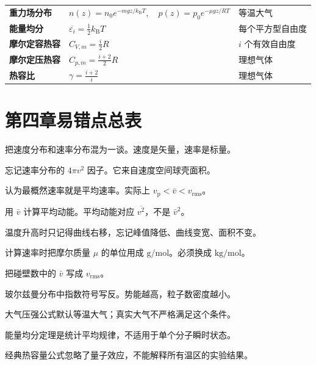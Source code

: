 {\begin{tabularx}{\textwidth}{@{}>{\bfseries}lXl@{}}
重力场分布 &
\(\displaystyle n(z)=n_0e^{-mgz/k_{\mathrm B}T},\quad p(z)=p_0e^{-\mu gz/RT}\)
& 等温大气\\[1em]

能量均分 &
\(\displaystyle \overline{\varepsilon_i}=\frac12k_{\mathrm B}T\)
& 每个平方型自由度\\[0.8em]

摩尔定容热容 &
\(\displaystyle C_{V,m}=\frac{i}{2}R\)
& \(i\) 个有效自由度\\[0.8em]

摩尔定压热容 &
\(\displaystyle C_{p,m}=\frac{i+2}{2}R\)
& 理想气体\\[0.8em]

热容比 &
\(\displaystyle \gamma=\frac{i+2}{i}\)
& 理想气体\\

\bottomrule
\end{tabularx}
}

\section{第四章易错点总表}

\begin{WarnBox}[本章高频错误]
\begin{PitfallList}
  \item 把速度分布和速率分布混为一谈。速度是矢量，速率是标量。
  \item 忘记速率分布的 \(4\pi v^2\) 因子。它来自速度空间球壳面积。
  \item 认为最概然速率就是平均速率。实际上 \(v_{\mathrm p}<\bar v<v_{\mathrm{rms}}\)。
  \item 用 \(\bar v\) 计算平均动能。平均动能对应 \(\overline{v^2}\)，不是 \(\bar v^2\)。
  \item 温度升高时只记得曲线右移，忘记峰值降低、曲线变宽、面积不变。
  \item 计算速率时把摩尔质量 \(\mu\) 的单位用成 \(\mathrm{g/mol}\)。必须换成 \(\mathrm{kg/mol}\)。
  \item 把碰壁数中的 \(\bar v\) 写成 \(v_{\mathrm{rms}}\)。
  \item 玻尔兹曼分布中指数符号写反。势能越高，粒子数密度越小。
  \item 大气压强公式默认等温大气；真实大气不严格满足这个条件。
  \item 能量均分定理是统计平均规律，不适用于单个分子瞬时状态。
  \item 经典热容量公式忽略了量子效应，不能解释所有温区的实验结果。
\end{PitfallList}
\end{WarnBox}

